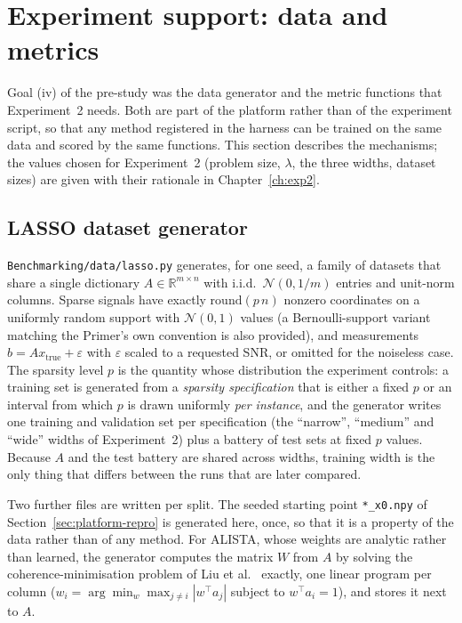 \section{Experiment support: data and metrics}
\label{sec:platform-data}

Goal (iv) of the pre-study was the data generator and the metric functions
that Experiment~2 needs. Both are part of the platform rather than of the
experiment script, so that any method registered in the harness can be
trained on the same data and scored by the same functions. This section
describes the mechanisms; the values chosen for Experiment~2 (problem size,
$\lambda$, the three widths, dataset sizes) are given with their rationale in
Chapter~\ref{ch:exp2}.

\subsection{LASSO dataset generator}

\texttt{Benchmarking/data/lasso.py} generates, for one seed, a family of
datasets that share a single dictionary $A \in \mathbb{R}^{m \times n}$ with
i.i.d.\ $\mathcal{N}(0, 1/m)$ entries and unit-norm columns. Sparse signals
have exactly $\mathrm{round}(p\,n)$ nonzero coordinates on a uniformly random
support with $\mathcal{N}(0,1)$ values (a Bernoulli-support variant matching
the Primer's own convention is also provided), and measurements
$b = A x_\mathrm{true} + \varepsilon$ with $\varepsilon$ scaled to a requested
SNR, or omitted for the noiseless case. The sparsity level $p$ is the quantity
whose distribution the experiment controls: a training set is generated from a
\emph{sparsity specification} that is either a fixed $p$ or an interval from
which $p$ is drawn uniformly \emph{per instance}, and the generator writes one
training and validation set per specification (the ``narrow'', ``medium'' and
``wide'' widths of Experiment~2) plus a battery of test sets at fixed $p$
values. Because $A$ and the test battery are shared across widths, training
width is the only thing that differs between the runs that are later
compared.

Two further files are written per split. The seeded starting point
\texttt{*\_x0.npy} of Section~\ref{sec:platform-repro} is generated here, once,
so that it is a property of the data rather than of any method. For ALISTA,
whose weights are analytic rather than learned, the generator computes the
matrix $W$ from $A$ by solving the coherence-minimisation problem of Liu et
al.~\cite{liu2019alista} exactly, one linear program per column
($w_i = \arg\min_w \max_{j \neq i} |w^\top a_j|$ subject to $w^\top a_i = 1$),
and stores it next to $A$.

